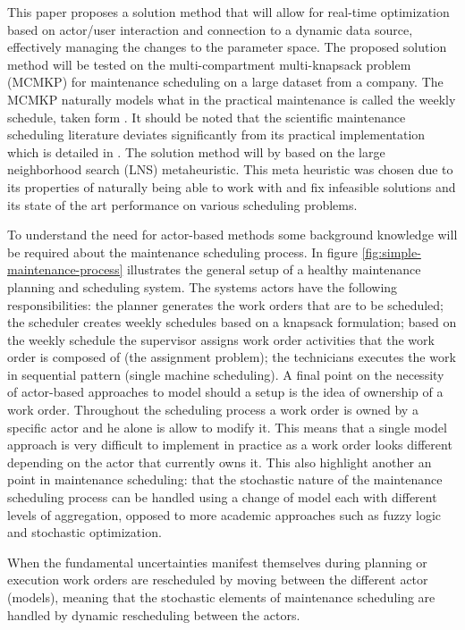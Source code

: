 \documentclass[preprint,12pt,authoryear]{elsarticle}
\begin{document}
This paper proposes a solution method that will allow for real-time optimization based on actor/user interaction and connection to a dynamic data source, effectively managing the changes to the parameter space. The proposed solution method will be tested on the multi-compartment multi-knapsack problem (MCMKP) for maintenance scheduling on a large dataset from a company. The MCMKP naturally models what in the practical maintenance is called the weekly schedule, taken form \citep{palmerMaintenancePlanningScheduling2019}. It should be noted that the scientific maintenance scheduling literature deviates significantly from its practical implementation which is detailed in \citep{palmerMaintenancePlanningScheduling2019}. The solution method will by based on the large neighborhood search (LNS) metaheuristic. This meta heuristic was chosen due to its properties of naturally being able to work with and fix infeasible solutions and its state of the art performance on various scheduling problems. 

To understand the need for actor-based methods some background knowledge will be required about the maintenance scheduling process. In figure \ref{fig:simple-maintenance-process} illustrates the general setup of a healthy maintenance planning and scheduling system. The systems actors have the following responsibilities: the planner generates the work orders that are to be scheduled; the scheduler creates weekly schedules based on a knapsack formulation; based on the weekly schedule the supervisor assigns work order activities that the work order is composed of (the assignment problem); the technicians executes the work in sequential pattern (single machine scheduling). A final point on the necessity of actor-based approaches to model should a setup is the idea of ownership of a work order. Throughout the scheduling process a work order is owned by a specific actor and he alone is allow to modify it. This means that a single model approach is very difficult to implement in practice as a work order looks different depending on the actor that currently owns it. This also highlight another an point in maintenance scheduling: that the stochastic nature of the maintenance scheduling process can be handled using a change of model each with different levels of aggregation, opposed to more academic approaches such as fuzzy logic and stochastic optimization.

When the fundamental uncertainties manifest themselves during planning or execution work orders are rescheduled by moving between the different actor (models), meaning that the stochastic elements of maintenance scheduling are handled by dynamic rescheduling between the actors.
\end{document}
